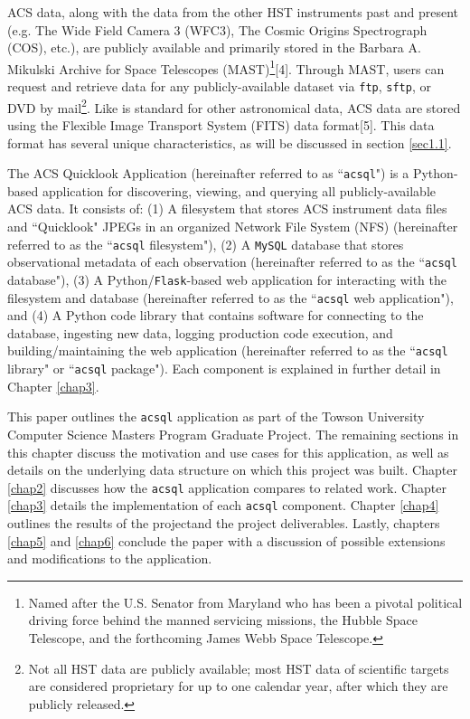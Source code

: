\documentclass[10pt,journal,compsoc]{IEEEtran}
\begin{document}
ACS data, along with the data from the other HST instruments past and present (e.g. The Wide Field Camera 3 (WFC3), The Cosmic Origins
Spectrograph (COS), etc.), are publicly available and primarily stored in the Barbara A. Mikulski Archive for Space Telescopes
(MAST)\footnote{Named after the U.S. Senator from Maryland who has been a pivotal political driving force behind the manned servicing
missions, the Hubble Space Telescope, and the forthcoming James Webb Space Telescope.}[4]. Through MAST, users can request and retrieve
data for any publicly-available dataset via \texttt{ftp}, \texttt{sftp}, or DVD by mail\footnote{Not all HST data are publicly available;
most HST data of scientific targets are considered proprietary for up to one calendar year, after which they are publicly released.}. Like is
standard for other astronomical data, ACS data are stored using the Flexible Image Transport System (FITS) data format[5].  This data format has several
unique characteristics, as will be discussed in section \ref{sec1.1}.

The ACS Quicklook Application (hereinafter referred to as ``\texttt{acsql}") is a Python-based application for discovering, viewing, and
querying all publicly-available ACS data.  It consists of: (1) A filesystem that stores ACS instrument data files
and ``Quicklook" JPEGs in an organized Network File System (NFS) (hereinafter referred to as the ``\texttt{acsql} filesystem"), (2) A
\texttt{MySQL} database that stores observational metadata of each observation (hereinafter referred to as the ``\texttt{acsql} database"),
(3) A Python/\texttt{Flask}-based web application for interacting with the filesystem and database (hereinafter referred to as the
``\texttt{acsql} web application"), and (4) A Python code library that contains software for connecting to the database, ingesting new data,
logging production code execution, and building/maintaining the web application (hereinafter referred to as the ``\texttt{acsql} library"
or ``\texttt{acsql} package").  Each component is explained in further detail in Chapter \ref{chap3}.

This paper outlines the \texttt{acsql} application as part of the Towson University Computer Science Masters Program Graduate Project.  The remaining
sections in this chapter discuss the motivation and use cases for this application, as well as details on the underlying data structure on
which this project was built.  Chapter \ref{chap2} discusses how the \texttt{acsql} application compares to related work.
Chapter \ref{chap3} details the implementation of each \texttt{acsql} component.  Chapter \ref{chap4} outlines the results of the projectand the
project deliverables.  Lastly, chapters \ref{chap5} and \ref{chap6} conclude the paper with a discussion of possible extensions and modifications to
the application.
\end{document}
